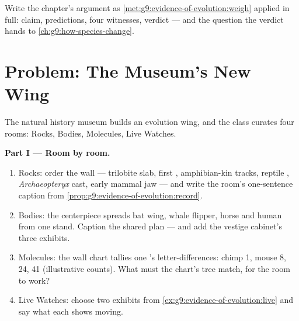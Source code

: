 \begin{exercise}[$\star\star\star$]\label{exo:g9:evidence-of-evolution:12}
Write the chapter's argument as
\cref{met:g9:evidence-of-evolution:weigh} applied in
full: claim, predictions, four witnesses, verdict ---
and the question the verdict hands to
\cref{ch:g9:how-species-change}.
\end{exercise}

\section{Problem: The Museum's New Wing}

\begin{problem}\label{pb:g9:evidence-of-evolution:1}
The natural history museum builds an evolution wing, and
the class curates four rooms: Rocks, Bodies, Molecules,
Live Watches.

\medskip\noindent\textbf{Part I --- Room by room.}
\begin{enumerate}
  \item Rocks: order the wall --- trilobite slab, first
        , amphibian-kin tracks, reptile ,
        \emph{Archaeopteryx} cast, early mammal jaw ---
        and write the room's one-sentence caption from
        \cref{prop:g9:evidence-of-evolution:record}.
  \item Bodies: the centerpiece spreads bat wing, whale
        flipper, horse  and human  from one
         stand. Caption the shared plan --- and
        add the vestige cabinet's three exhibits.
  \item Molecules: the wall chart tallies one 's
        letter-differences: chimp 1, mouse 8,  24,
         41 (illustrative counts). What must the
        chart's tree match, for the room to work?
  \item Live Watches: choose two exhibits from
        \cref{ex:g9:evidence-of-evolution:live} and say
        what each shows moving.
\end{enumerate}


\end{problem}
